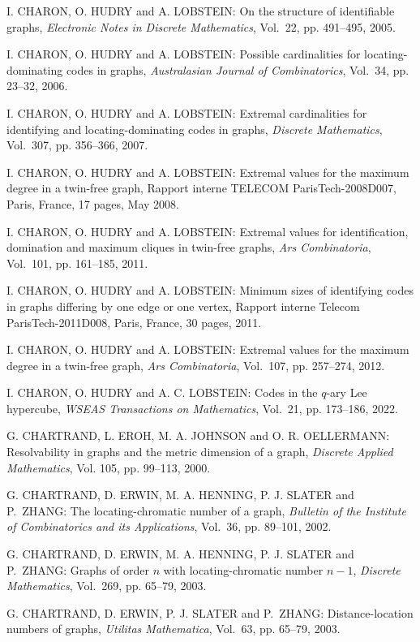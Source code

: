 \begin{thebibliography}{999}
I. CHARON, O. HUDRY and A. LOBSTEIN: On the structure of identifiable graphs, {\it Electronic Notes in Discrete Mathematics}, Vol.~22, pp. 491--495, 2005.

I. CHARON, O. HUDRY and A. LOBSTEIN: Possible cardinalities for locating-dominating codes in graphs, {\it Australasian Journal of Combinatorics}, Vol.~34, pp. 23--32, 2006.

I. CHARON, O. HUDRY and A. LOBSTEIN: Extremal cardinalities for identifying and locating-dominating codes in graphs, {\it Discrete Mathematics}, Vol.~307, pp. 356--366, 2007.

I. CHARON, O. HUDRY and A. LOBSTEIN: Extremal values for the maximum degree in a twin-free graph, Rapport interne TELECOM ParisTech-2008D007, Paris, France, 17 pages, May 2008.

I. CHARON, O. HUDRY and A. LOBSTEIN: Extremal values for identification, domination and maximum cliques in twin-free graphs, {\it Ars Combinatoria}, Vol.~101, pp. 161--185, 2011.

I. CHARON, O. HUDRY and A. LOBSTEIN: Minimum sizes of identifying codes in graphs differing by one edge or one vertex, Rapport interne Telecom ParisTech-2011D008, Paris, France, 30 pages, 2011.

I. CHARON, O. HUDRY and A. LOBSTEIN: Extremal values for the maximum degree in a twin-free graph, {\it Ars Combinatoria}, Vol.~107, pp. 257--274, 2012.

I. CHARON, O. HUDRY and A. C. LOBSTEIN: Codes in the $q$-ary Lee hypercube, {\it WSEAS Transactions on Mathematics}, Vol.~21, pp. 173--186, 2022.

G. CHARTRAND, L. EROH, M. A. JOHNSON and O. R. OELLERMANN: Resolvability in graphs and the metric dimension of a graph, {\it Discrete Applied Mathematics}, Vol. 105, pp. 99--113, 2000.

G. CHARTRAND, D. ERWIN, M. A. HENNING, P. J. SLATER and P.~ZHANG: The locating-chromatic number of a graph, {\it Bulletin of the Institute of Combinatorics and its Applications}, Vol.~36, pp. 89--101, 2002.

G. CHARTRAND, D. ERWIN, M. A. HENNING, P. J. SLATER and P.~ZHANG: Graphs of order $n$ with locating-chromatic number $n-1$, {\it Discrete Mathematics}, Vol.~269, pp. 65--79, 2003.

G. CHARTRAND, D. ERWIN, P. J. SLATER and P.~ZHANG: Distance-location numbers of graphs, {\it Utilitas Mathematica}, Vol.~63, pp. 65--79, 2003.


\end{thebibliography}
